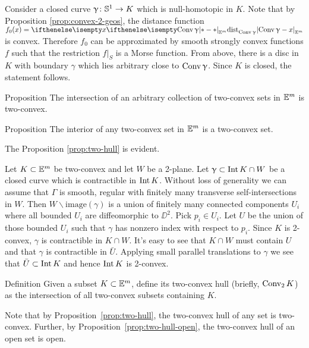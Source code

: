 Consider a closed curve $\gamma\:\SS^1\to K$ which is null-homotopic in $K$.
Note that by Proposition \ref{prop:convex-2-geos}, the distance function $f_0(x)=\dist{\Conv\gamma}{x}{\EE^m}$ is convex.
Therefore $f_0$ can be approximated by smooth strongly convex functions $f$ such that the restriction $f|_S$ is a Morse function.
From above, there is a disc in $K$ with boundary $\gamma$
which lies arbitrary close to $\mathop{\rm Conv}\nolimits\upgamma$.
Since $K$ is closed, the statement follows.
\qeds

\begin{thm}{Proposition}\label{prop:two-hull}
The intersection of an arbitrary collection of two-convex sets in $\mathbb{E}^m$ is two-convex.
\end{thm}

\begin{thm}{Proposition}\label{prop:two-hull-open}
The interior of any two-convex set in $\mathbb{E}^m$ is a two-convex set.
\end{thm}


The Proposition \ref{prop:two-hull} is evident.

Let $K\subset \EE^m$ be two-convex and let $W$ be a 2-plane.
Let $\gamma\subset \Int K\cap W$ be a closed curve which is contractible in $\mathop{\rm Int}\nolimits K$. Without loss of generality we can assume that $\Gamma$ is smooth, regular with finitely many transverse self-intersections in $W$.
Then $W\backslash \mathrm{image}( \gamma)$ is a union of finitely many connected components $U_i$ where all bounded $U_i$ are diffeomorphic to $\DD^2$. Pick $p_i\in U_i$. Let $U$ be the union of those bounded $U_i$ such that
$\gamma$ has nonzero index with respect to $p_i$. Since $K$ is 2-convex, $\gamma$ is contractible in $K\cap W$. It's easy to see that $K\cap W$ must contain $U$ and that $\gamma$ is contractible in $\bar U$. Applying small parallel translations to $\gamma$ we see that $\bar U\subset \Int K$ and hence $\mathop{\rm Int}\nolimits K$ is 2-convex.


\qeds

\begin{thm}{Definition}
Given a subset $K\subset \EE^m$, define its two-convex hull (briefly, $\mathop{\rm Conv}\nolimits_2K$) as the intersection of all two-convex subsets containing $K$.
\end{thm}

Note that by Proposition~\ref{prop:two-hull},
the two-convex hull of any set is two-convex.
Further, 
by Proposition~\ref{prop:two-hull-open}, the
two-convex hull of an open set is open.

